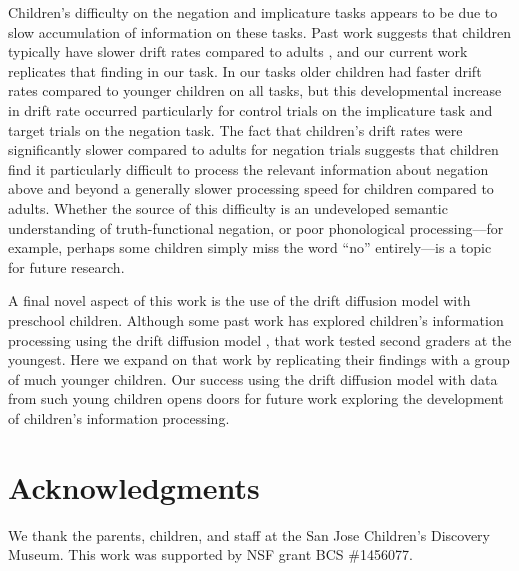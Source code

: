 \documentclass[10pt,letterpaper]{article}
\begin{document}
Children's difficulty on the negation and implicature tasks appears to be due to slow accumulation of information on these tasks. Past work suggests that children typically have slower drift rates compared to adults \cite{ratcliff2012}, and our current work replicates that finding in our task. In our tasks older children had faster drift rates compared to younger children on all tasks, but this developmental increase in drift rate occurred particularly for control trials on the implicature task and target trials on the negation task. The fact that children's drift rates were significantly slower compared to adults for negation trials suggests that children find it particularly difficult to process the relevant information about negation above and beyond a generally slower processing speed for children compared to adults. Whether the source of this difficulty is an undeveloped semantic understanding of truth-functional negation, or poor phonological processing---for example, perhaps some children simply miss the word ``no'' entirely---is a topic for future research.

A final novel aspect of this work is the use of the drift diffusion model with preschool children. Although some past work has explored children's information processing using the drift diffusion model \cite{ratcliff2012}, that work tested second graders at the youngest. Here we expand on that work by replicating their findings with a group of much younger children. Our success using the drift diffusion model with data from such young children opens doors for future work exploring the development of children's information processing.

\section{Acknowledgments}
%
We thank the parents, children, and staff at the San Jose Children's Discovery Museum. This work was supported by NSF grant BCS \#1456077.




\setlength{\bibleftmargin}{.125in}
\setlength{\bibindent}{-\bibleftmargin}


\end{document}
